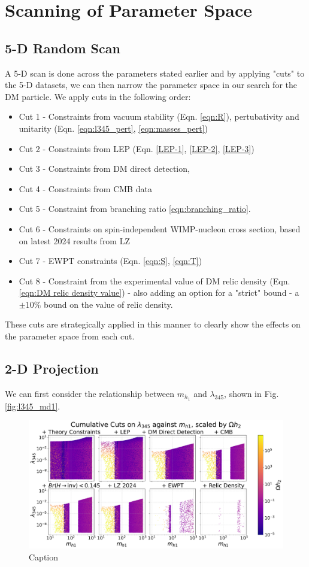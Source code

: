 \documentclass[12pt]{article}
\begin{document}
\section{Scanning of Parameter Space}
\label{sec:results}
\subsection{5-D Random Scan}
\label{5-D scan}
A 5-D scan is done across the parameters stated earlier and by applying "cuts" to the 5-D datasets, we can then narrow the parameter space in our search for the DM particle.
We apply cuts in the following order:
\begin{itemize}
    \item Cut 1 - Constraints from vacuum stability (Eqn. \ref{eqn:R}), pertubativity and unitarity (Eqn. \ref{eqn:l345_pert}, \ref{eqn:masses_pert}) 
    \item Cut 2 - Constraints from LEP (Eqn. \ref{LEP-1}, \ref{LEP-2}, \ref{LEP-3}) 
    \item Cut 3 - Constraints from DM direct detection, 
    \item Cut 4 - Constraints from CMB data
    \item Cut 5 - Constraint from branching ratio \ref{eqn:branching_ratio}.
    \item Cut 6 - Constraints on spin-independent WIMP-nucleon cross section, based on latest 2024 results from LZ \cite{aalbers2024darkmattersearchresults}
    \item Cut 7 - EWPT constraints (Eqn. \ref{eqn:S}, \ref{eqn:T})
    \item Cut 8 - Constraint from the experimental value of DM relic density (Eqn. \ref{eqn:DM relic density value}) - also adding an option for a "strict" bound - a $\pm 10 \%$ bound on the value of relic density.
\end{itemize}
These cuts are strategically applied in this manner to clearly show the effects on the parameter space from each cut.
\subsection{2-D Projection}
\label{sec:2D-proj}
We can first consider the relationship between $m_{h_1}$ and $\lambda_{345}$, shown in Fig. \ref{fig:l345_md1}.  

\begin{figure}[H]
    \centering
    \includegraphics[width=\linewidth]{big_plots_(low_dpi)/l345_against_MD1_Omegah2.pdf}
    \caption{Caption}
    \label{fig:enter-label}
\end{figure}
\end{document}
